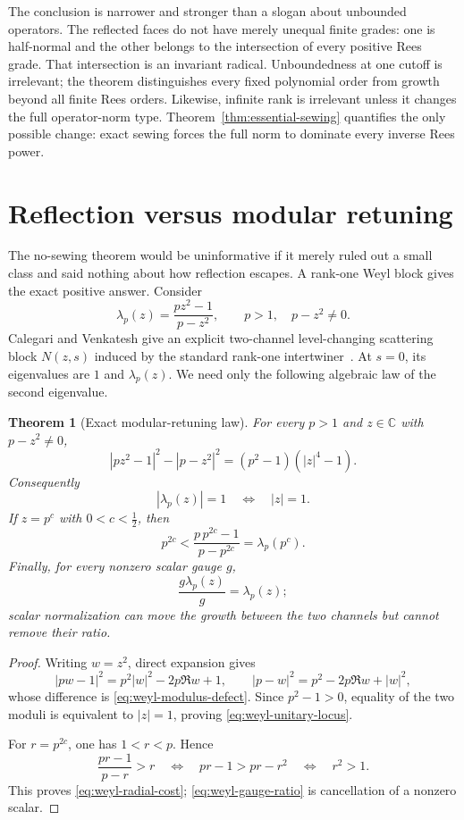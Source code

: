 \documentclass[11pt]{article}
\newtheorem{theorem}{Theorem}[section]
\theoremstyle{definition}
\theoremstyle{remark}
\newcommand{\C}{\mathbb C}
\begin{document}
The conclusion is narrower and stronger than a slogan about unbounded operators.  The reflected
faces do not have merely unequal finite grades: one is half-normal and the other belongs to the
intersection of every positive Rees grade.  That intersection is an invariant radical.
Unboundedness at one cutoff is irrelevant; the theorem distinguishes every fixed polynomial
order from growth beyond all finite Rees orders.  Likewise, infinite rank is irrelevant unless
it changes the full operator-norm type.  Theorem~\ref{thm:essential-sewing} quantifies the only
possible change: exact sewing forces the full norm to dominate every inverse Rees power.

\section{Reflection versus modular retuning}\label{sec:modular-retuning}

The no-sewing theorem would be uninformative if it merely ruled out a small class and said
nothing about how reflection escapes.  A rank-one Weyl block gives the exact positive answer.
Consider
\[
 \lambda_p(z)=\frac{pz^2-1}{p-z^2},
 \qquad p>1,\quad p-z^2\neq0.
 \tag{5.1}\label{eq:weyl-eigenvalue}
\]
Calegari and Venkatesh give an explicit two-channel level-changing scattering block
\(N(z,s)\) induced by the standard rank-one intertwiner~\cite[\S6.6.1]{CalegariVenkatesh}.
At \(s=0\), its eigenvalues are \(1\) and \(\lambda_p(z)\).  We need only the following
algebraic law of the second eigenvalue.

\begin{theorem}[Exact modular-retuning law]\label{thm:weyl-retuning}
For every \(p>1\) and \(z\in\C\) with \(p-z^2\neq0\),
\[
 |pz^2-1|^2-|p-z^2|^2
 =(p^2-1)(|z|^4-1).
 \tag{5.2}\label{eq:weyl-modulus-defect}
\]
Consequently
\[
 |\lambda_p(z)|=1\quad\Longleftrightarrow\quad |z|=1.
 \tag{5.3}\label{eq:weyl-unitary-locus}
\]
If \(z=p^c\) with \(0<c<\tfrac12\), then
\[
 p^{2c}<
 \frac{p\,p^{2c}-1}{p-p^{2c}}
 =\lambda_p(p^c).
 \tag{5.4}\label{eq:weyl-radial-cost}
\]
Finally, for every nonzero scalar gauge \(g\),
\[
 \frac{g\lambda_p(z)}{g}=\lambda_p(z);
 \tag{5.5}\label{eq:weyl-gauge-ratio}
\]
scalar normalization can move the growth between the two channels but cannot remove their
ratio.
\end{theorem}

\begin{proof}
Writing \(w=z^2\), direct expansion gives
\[
 |pw-1|^2=p^2|w|^2-2p\Re w+1,
 \qquad
 |p-w|^2=p^2-2p\Re w+|w|^2,
\]
whose difference is \eqref{eq:weyl-modulus-defect}.  Since \(p^2-1>0\), equality of the two
moduli is equivalent to \(|z|=1\), proving \eqref{eq:weyl-unitary-locus}.

For \(r=p^{2c}\), one has \(1<r<p\).  Hence
\[
 \frac{pr-1}{p-r}>r
 \quad\Longleftrightarrow\quad
 pr-1>pr-r^2
 \quad\Longleftrightarrow\quad r^2>1.
\]
This proves \eqref{eq:weyl-radial-cost}; \eqref{eq:weyl-gauge-ratio} is cancellation of a
nonzero scalar.
\end{proof}
\end{document}
